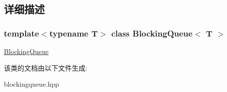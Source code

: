 \subsection{详细描述}
\subsubsection*{template$<$typename T$>$\newline
class Blocking\+Queue$<$ T $>$}

\hyperlink{classBlockingQueue}{Blocking\+Queue} 

该类的文档由以下文件生成\+:\begin{DoxyCompactItemize}
\item 
blockingqueue.\+hpp\end{DoxyCompactItemize}
